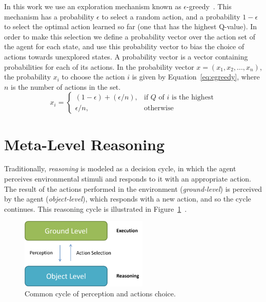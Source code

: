 In this work we use an exploration mechanism known as $\epsilon$-greedy~\cite{rodrigues2009dynamic}. 
This mechanism has a probability $\epsilon$ to select a random action, and a probability $1 - \epsilon$ to select the optimal action learned so far (one that has the highest Q-value).
In order to make this selection we define a probability vector over the action set of the agent for each state, and use this probability vector to bias the choice of actions towards unexplored states.
A probability vector is a vector containing probabilities for each of its actions.
In the probability vector $x = (x_1, x_2, ..., x_n)$, the probability $x_i$ to choose the action $i$ is given by Equation~\ref{eq:egreedy}, where $n$ is the number of actions in the set.
\begin{equation} \label{eq:egreedy}
	x_i = \left\{
  \begin{array}{ll}
    (1 - \epsilon) + (\epsilon / n), & \mbox{if $Q$ of $i$ is the highest} \\
    \epsilon / n, & \mbox{otherwise}
  \end{array}\right.
\end{equation}



\section{Meta-Level Reasoning}
\label{sec:meta-reasoning}

Traditionally, \textit{reasoning} is modeled as a decision cycle, in which the agent perceives environmental stimuli and responds to it with an appropriate action. 
The result of the actions performed in the environment (\textit{ground-level})
is perceived by the agent (\textit{object-level}), which responds with a new action,
and so the cycle continues. 
This reasoning cycle is illustrated in Figure~\ref{fig:reasoning}~\cite{cox2007metareasoning}. 

\begin{figure}[ht]
\centering
\includegraphics[width=230px]{images/reasoning}
\caption{Common cycle of perception and actions choice.}
\label{fig:reasoning}
\end{figure}

